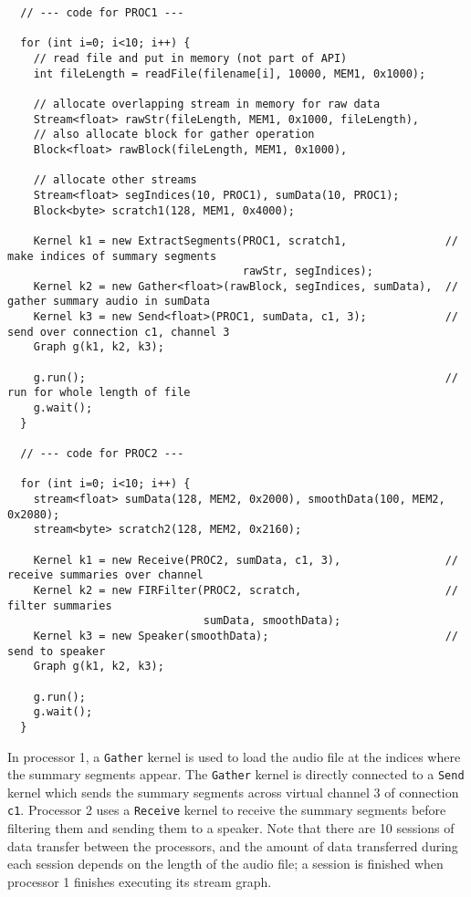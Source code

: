 {\small
\begin{verbatim}
  // --- code for PROC1 ---

  for (int i=0; i<10; i++) {
    // read file and put in memory (not part of API)
    int fileLength = readFile(filename[i], 10000, MEM1, 0x1000);

    // allocate overlapping stream in memory for raw data
    Stream<float> rawStr(fileLength, MEM1, 0x1000, fileLength), 
    // also allocate block for gather operation
    Block<float> rawBlock(fileLength, MEM1, 0x1000), 

    // allocate other streams
    Stream<float> segIndices(10, PROC1), sumData(10, PROC1);
    Block<byte> scratch1(128, MEM1, 0x4000);

    Kernel k1 = new ExtractSegments(PROC1, scratch1,               // make indices of summary segments
                                    rawStr, segIndices);
    Kernel k2 = new Gather<float>(rawBlock, segIndices, sumData),  // gather summary audio in sumData
    Kernel k3 = new Send<float>(PROC1, sumData, c1, 3);            // send over connection c1, channel 3
    Graph g(k1, k2, k3);
            
    g.run();                                                       // run for whole length of file
    g.wait();
  }

  // --- code for PROC2 ---

  for (int i=0; i<10; i++) {
    stream<float> sumData(128, MEM2, 0x2000), smoothData(100, MEM2, 0x2080);
    stream<byte> scratch2(128, MEM2, 0x2160);

    Kernel k1 = new Receive(PROC2, sumData, c1, 3),                // receive summaries over channel
    Kernel k2 = new FIRFilter(PROC2, scratch,                      // filter summaries
                              sumData, smoothData);
    Kernel k3 = new Speaker(smoothData);                           // send to speaker
    Graph g(k1, k2, k3);

    g.run();
    g.wait();
  }   
\end{verbatim}}
In processor 1, a {\tt Gather} kernel is used to load the audio file
at the indices where the summary segments appear.  The {\tt Gather}
kernel is directly connected to a {\tt Send} kernel which sends the
summary segments across virtual channel 3 of connection {\tt c1}.
Processor 2 uses a {\tt Receive} kernel to receive the summary
segments before filtering them and sending them to a speaker.  Note
that there are 10 sessions of data transfer between the processors,
and the amount of data transferred during each session depends on the
length of the audio file; a session is finished when processor 1
finishes executing its stream graph.
